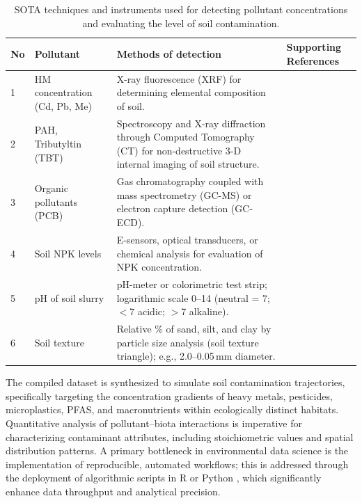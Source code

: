 \documentclass[preprint,12pt]{elsarticle}            %
\begin{document}
\begin{table}[htbp]
\caption{SOTA techniques and instruments used for detecting pollutant
    concentrations and evaluating the level of soil
    contamination.}\label{tab1}
\begin{tabularx}{\textwidth}{@{} p{0.8cm} p{2.2cm} p{5.5cm} X @{}}
\toprule
\textbf{No} & \textbf{Pollutant} & \textbf{Methods of detection}
    & \textbf{Supporting References} \\
\midrule
1 & HM concentration (Cd, Pb, Me)
    & X-ray fluorescence (XRF) for determining elemental composition of
      soil.
    & \cite{Lu2023,LindhLemenkova2023b,Wan2019,Mukhopadhyay2020,Adewumi2024,Feng2024,Hu2020,Li2019} \\[4pt]
2 & PAH, Tributyltin (TBT)
    & Spectroscopy and X-ray diffraction through Computed Tomography (CT)
      for non-destructive 3-D internal imaging of soil structure.
    & \cite{LindhLemenkova2022d,Deceuster2012,Racic2025,LindhLemenkova2022a,Xu2026,Stojic2019} \\[4pt]
3 & Organic pollutants (PCB)
    & Gas chromatography coupled with mass spectrometry (GC-MS) or
      electron capture detection (GC-ECD).
    & \cite{Bustamante2025,Anagnostou2025,Sandu2025,Shen2024,Appel2022,Arnesdotter2025} \\[4pt]
4 & Soil NPK levels
    & E-sensors, optical transducers, or chemical analysis for evaluation
      of NPK concentration.
    & \cite{Hossain2024,Pal2024,Ma2024,Guan2024,Atoloye2024,Luo2017} \\[4pt]
5 & pH of soil slurry
    & pH-meter or colorimetric test strip; logarithmic scale 0--14
      (neutral = 7; $<$7 acidic; $>$7 alkaline).
    & \cite{Zireeni2023,LindhLemenkova2022b,Rahman2014,Hepperly2009,LindhLemenkova2023c,Guo2021} \\[4pt]
6 & Soil texture
    & Relative \% of sand, silt, and clay by particle size analysis (soil
      texture triangle); e.g., 2.0--0.05\,mm diameter.
    & \cite{Polakowski2023,LindhLemenkova2023d,Mozaffari2026,LindhLemenkova2023a,LindhLemenkova2023e,Jing2023,Wang2022} \\
\bottomrule
\end{tabularx}
\end{table}

The compiled dataset is synthesized to simulate soil contamination
trajectories, specifically targeting the concentration gradients of heavy
metals, pesticides, microplastics, PFAS, and macronutrients within
ecologically distinct habitats. Quantitative analysis of pollutant--biota
interactions is imperative for characterizing contaminant attributes,
including stoichiometric values and spatial distribution patterns. A primary
bottleneck in environmental data science is the implementation of
reproducible, automated workflows; this is addressed through the deployment
of algorithmic scripts in R or Python
\cite{Olah2025,Lemenkova2022,Wang2024b}, which significantly enhance data
throughput and analytical precision.
\end{document}
